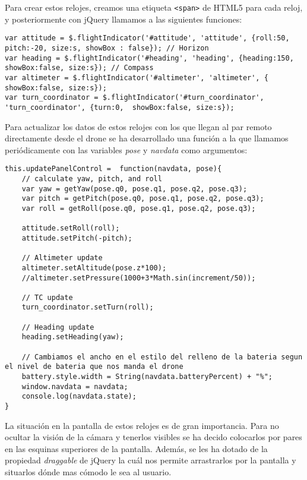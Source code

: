 Para crear estos relojes, creamos una etiqueta \texttt{<span>} de HTML5 para cada reloj, y posteriormente con jQuery llamamos a las siguientes funciones:\\

\begin{lstlisting}[caption=Creación de los relojes.]
var attitude = $.flightIndicator('#attitude', 'attitude', {roll:50, pitch:-20, size:s, showBox : false}); // Horizon
var heading = $.flightIndicator('#heading', 'heading', {heading:150, showBox:false, size:s}); // Compass
var altimeter = $.flightIndicator('#altimeter', 'altimeter', { showBox:false, size:s});
var turn_coordinator = $.flightIndicator('#turn_coordinator', 'turn_coordinator', {turn:0,  showBox:false, size:s}); 
\end{lstlisting}

Para actualizar los datos de estos relojes con los que llegan al par remoto directamente desde el drone se ha desarrollado una función a la que llamamos periódicamente con las variables \emph{pose} y \emph{navdata} como argumentos:\\

\begin{lstlisting}[caption=Actualización de los relojes.]
this.updatePanelControl =  function(navdata, pose){
    // calculate yaw, pitch, and roll
    var yaw = getYaw(pose.q0, pose.q1, pose.q2, pose.q3);
    var pitch = getPitch(pose.q0, pose.q1, pose.q2, pose.q3);
    var roll = getRoll(pose.q0, pose.q1, pose.q2, pose.q3);
    
    attitude.setRoll(roll);
    attitude.setPitch(-pitch);

    // Altimeter update
    altimeter.setAltitude(pose.z*100);
    //altimeter.setPressure(1000+3*Math.sin(increment/50));

    // TC update
    turn_coordinator.setTurn(roll);

    // Heading update
    heading.setHeading(yaw);
    
    // Cambiamos el ancho en el estilo del relleno de la bateria segun el nivel de bateria que nos manda el drone
    battery.style.width = String(navdata.batteryPercent) + "%";
    window.navdata = navdata;
    console.log(navdata.state);
}
\end{lstlisting}

La situación en la pantalla de estos relojes es de gran importancia. Para no ocultar la visión de la cámara y tenerlos visibles se ha decido colocarlos por pares en las esquinas superiores de la pantalla. Además, se les ha dotado de la propiedad \emph{draggable} de jQuery la cuál nos permite arrastrarlos por la pantalla y situarlos dónde mas cómodo le sea al usuario.\\

